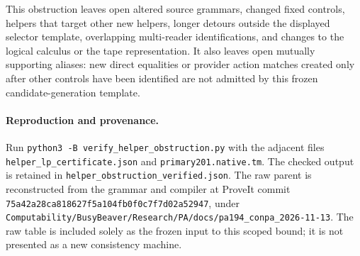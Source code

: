 This obstruction leaves open altered source grammars, changed fixed
controls, helpers that target other new helpers, longer detours outside
the displayed selector template, overlapping multi-reader identifications,
and changes to the logical calculus or the tape representation. It also
leaves open mutually supporting aliases: new direct equalities or provider
action matches created only after other controls have been identified are
not admitted by this frozen candidate-generation template.

\paragraph{Reproduction and provenance.}
Run \texttt{python3 -B verify\_helper\_obstruction.py} with the adjacent files
\texttt{helper\_lp\_certificate.json} and \texttt{primary201.native.tm}.
The checked output is retained in \texttt{helper\_obstruction\_verified.json}.
The raw parent is reconstructed from the grammar and compiler at ProveIt
commit \texttt{75a42a28ca818627f5a104fb0f0c7f7d02a52947}, under
\texttt{Computability/BusyBeaver/Research/PA/docs/pa194\_conpa\_2026-11-13}.
The raw table is included solely as the frozen input to this scoped bound;
it is not presented as a new consistency machine.
